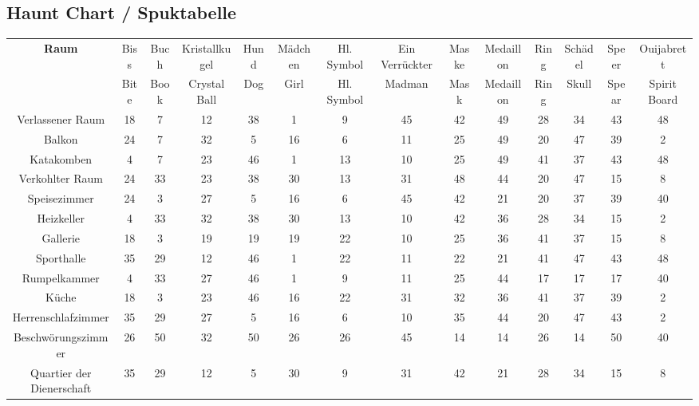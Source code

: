 \begin{landscape}
\section{Haunt Chart / Spuktabelle}

\begin{tabular}{cccccccccccccc}

\textbf{Raum} &  Biss  & Buch   & Kristallkugel  & Hund  & \footnotesize{Mädchen} & Hl. Symbol & \footnotesize{Ein Verrückter}  &  Maske & Medaillon  & Ring & Schädel  & Speer & Ouijabrett \\
 &  Bite  & Book   & Crystal Ball  & Dog  & Girl & Hl. Symbol &  Madman  &  Mask & Medaillon  & Ring & Skull  & Spear & \footnotesize{Spirit Board} \\
Verlassener Raum   & 18 & 7  & 12 & 38 & 1  & 9  & 45 & 42 & 49 & 28 & 34  & 43  & 48 \\
Balkon & 24 & 7  & 32 & 5  & 16 & 6  & 11 & 25 & 49 & 20 & 47  & 39  & 2 \\
Katakomben & 4  & 7  & 23 & 46 & 1  & 13 & 10 & 25 & 49 & 41 & 37  & 43  & 48 \\
Verkohlter Raum & 24 & 33 & 23 & 38 & 30 & 13 & 31 & 48 & 44 & 20 & 47  & 15  & 8 \\
Speisezimmer   & 24 & 3  & 27 & 5  & 16 & 6  & 45 & 42 & 21 & 20 & 37  & 39  & 40 \\
Heizkeller & 4  & 33 & 32 & 38 & 30 & 13 & 10 & 42 & 36 & 28 & 34  & 15  & 2 \\
Gallerie   & 18 & 3  & 19 & 19 & 19 & 22 & 10 & 25 & 36 & 41 & 37  & 15  & 8 \\
Sporthalle & 35 & 29 & 12 & 46 & 1  & 22 & 11 & 22 & 21 & 41 & 47  & 43  & 48 \\
Rumpelkammer   & 4  & 33 & 27 & 46 & 1  & 9  & 11 & 25 & 44 & 17 & 17  & 17  & 40 \\
Küche  & 18 & 3  & 23 & 46 & 16 & 22 & 31 & 32 & 36 & 41 & 37  & 39  & 2 \\
Herrenschlafzimmer & 35 & 29 & 27 & 5  & 16 & 6  & 10 & 35 & 44 & 20 & 47  & 43  & 2 \\
Beschwörungszimmer & 26 & 50 & 32 & 50 & 26 & 26 & 45 & 14 & 14 & 26 & 14  & 50  & 40 \\
\footnotesize{Quartier der Dienerschaft}  & 35 & 29 & 12 & 5  & 30 & 9  & 31 & 42 & 21 & 28 & 34  & 15  & 8 \\

\end{tabular}


\end{landscape}
